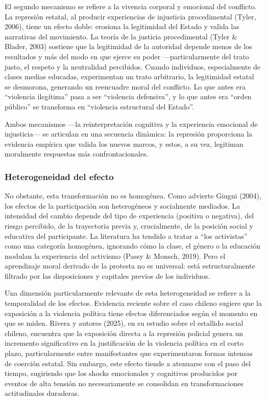 \documentclass[
  13pt,
]{article}
\begin{document}
El segundo mecanismo se refiere a la vivencia corporal y emocional del
conflicto. La represión estatal, al producir experiencias de injusticia
procedimental (Tyler, 2006), tiene un efecto doble: erosiona la
legitimidad del Estado y valida las narrativas del movimiento. La teoría
de la justicia procedimental (Tyler \& Blader, 2003) sostiene que la
legitimidad de la autoridad depende menos de los resultados y más del
modo en que ejerce su poder ---particularmente del trato justo, el
respeto y la neutralidad percibidos. Cuando individuos, especialmente de
clases medias educadas, experimentan un trato arbitrario, la legitimidad
estatal se desmorona, generando un reencuadre moral del conflicto. Lo
que antes era ``violencia ilegítima'' pasa a ser ``violencia
defensiva'', y lo que antes era ``orden público'' se transforma en
``violencia estructural del Estado''.

Ambos mecanismos ---la reinterpretación cognitiva y la experiencia
emocional de injusticia--- se articulan en una secuencia dinámica: la
represión proporciona la evidencia empírica que valida los nuevos
marcos, y estos, a su vez, legitiman moralmente respuestas más
confrontacionales.

\subsubsection{Heterogeneidad del
efecto}\label{heterogeneidad-del-efecto}

No obstante, esta transformación no es homogénea. Como advierte Giugni
(2004), los efectos de la participación son heterogéneos y socialmente
mediados. La intensidad del cambio depende del tipo de experiencia
(positiva o negativa), del riesgo percibido, de la trayectoria previa y,
crucialmente, de la posición social y educativa del participante. La
literatura ha tendido a tratar a ``los activistas'' como una categoría
homogénea, ignorando cómo la clase, el género o la educación modulan la
experiencia del activismo (Passy \& Monsch, 2019). Pero el aprendizaje
moral derivado de la protesta no es universal: está estructuralmente
filtrado por las disposiciones y capitales previos de los individuos.

Una dimensión particularmente relevante de esta heterogeneidad se
refiere a la temporalidad de los efectos. Evidencia reciente sobre el
caso chileno sugiere que la exposición a la violencia política tiene
efectos diferenciados según el momento en que se miden. Rivera y autores
(2025), en su estudio sobre el estallido social chileno, encuentra que
la exposición directa a la represión policial genera un incremento
significativo en la justificación de la violencia política en el corto
plazo, particularmente entre manifestantes que experimentaron formas
intensas de coerción estatal. Sin embargo, este efecto tiende a
atenuarse con el paso del tiempo, sugiriendo que los shocks emocionales
y cognitivos producidos por eventos de alta tensión no necesariamente se
consolidan en transformaciones actitudinales duraderas.
\end{document}
